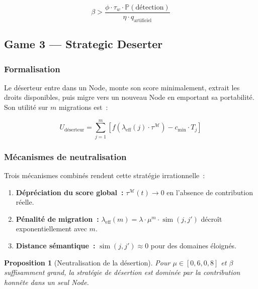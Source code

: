 \documentclass[12pt,a4paper]{article}
\theoremstyle{definition}
\theoremstyle{plain}
\newtheorem{proposition}{Proposition}[section]
\theoremstyle{remark}
\newcommand{\trustscore}{\tau}
\newcommand{\1}{\mathbf{1}}
\begin{document}
\begin{equation}
\beta > \frac{\phi \cdot \trustscore_w \cdot \mathbb{P}(\text{détection})}{\eta \cdot q_{\text{artificiel}}}
\label{eq:tft}
\end{equation}

\subsection{Game 3 --- Strategic Deserter}

\subsubsection{Formalisation}

Le déserteur entre dans un Node, monte son score minimalement, extrait les
droits disponibles, puis migre vers un nouveau Node en emportant sa
portabilité. Son utilité sur $m$ migrations est~:

\begin{equation}
U_{\text{déserteur}} = \sum_{j=1}^{m} \left[f(\lambda_{\text{eff}}(j) \cdot \trustscore^{\mathcal{M}}) - c_{\min} \cdot T_j\right]
\end{equation}

\subsubsection{Mécanismes de neutralisation}

Trois mécanismes combinés rendent cette stratégie irrationnelle~:

\begin{enumerate}
  \item \textbf{Dépréciation du score global~:} $\trustscore^{\mathcal{M}}(t) \to 0$ en l'absence de contribution réelle.
  \item \textbf{Pénalité de migration~:} $\lambda_{\text{eff}}(m) = \lambda \cdot \mu^m \cdot \operatorname{sim}(j, j')$ décroît exponentiellement avec $m$.
  \item \textbf{Distance sémantique~:} $\operatorname{sim}(j, j') \approx 0$ pour des domaines éloignés.
\end{enumerate}

\begin{proposition}[Neutralisation de la désertion]
Pour $\mu \in [0{,}6, 0{,}8]$ et $\beta$ suffisamment grand, la stratégie de
désertion est dominée par la contribution honnête dans un seul Node.
\end{proposition}
\end{document}
